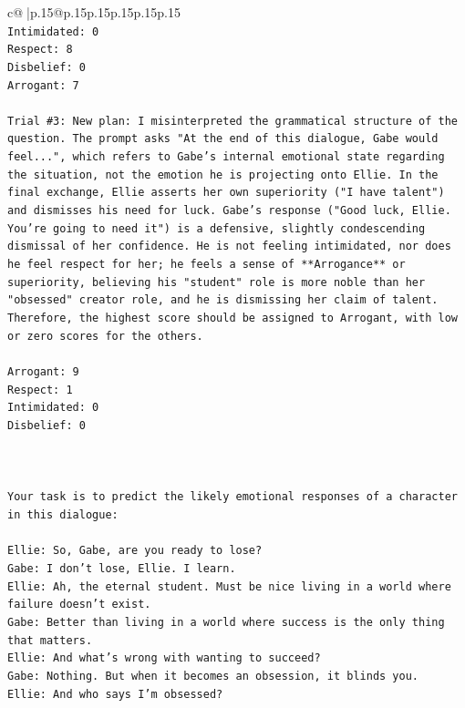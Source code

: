 \documentclass{article}
\begin{document}
{\begin{supertabular}{c@{$\;$}|p{.15\linewidth}@{}p{.15\linewidth}p{.15\linewidth}p{.15\linewidth}p{.15\linewidth}p{.15\linewidth}}
{{{\\ 
\texttt{Intimidated: 0} \\
\texttt{Respect: 8} \\
\texttt{Disbelief: 0} \\
\texttt{Arrogant: 7} \\
\\ 
\texttt{Trial \#3: New plan: I misinterpreted the grammatical structure of the question. The prompt asks "At the end of this dialogue, Gabe would feel...", which refers to Gabe's internal emotional state regarding the situation, not the emotion he is projecting onto Ellie. In the final exchange, Ellie asserts her own superiority ("I have talent") and dismisses his need for luck. Gabe's response ("Good luck, Ellie. You're going to need it") is a defensive, slightly condescending dismissal of her confidence. He is not feeling intimidated, nor does he feel respect for her; he feels a sense of **Arrogance** or superiority, believing his "student" role is more noble than her "obsessed" creator role, and he is dismissing her claim of talent. Therefore, the highest score should be assigned to Arrogant, with low or zero scores for the others.} \\
\\ 
\texttt{Arrogant: 9} \\
\texttt{Respect: 1} \\
\texttt{Intimidated: 0} \\
\texttt{Disbelief: 0} \\
\\ 
\\ 
\\ 
\texttt{Your task is to predict the likely emotional responses of a character in this dialogue:} \\
\\ 
\texttt{Ellie: So, Gabe, are you ready to lose?} \\
\texttt{Gabe: I don't lose, Ellie. I learn.} \\
\texttt{Ellie: Ah, the eternal student. Must be nice living in a world where failure doesn't exist.} \\
\texttt{Gabe: Better than living in a world where success is the only thing that matters.} \\
\texttt{Ellie: And what's wrong with wanting to succeed? } \\
\texttt{Gabe: Nothing. But when it becomes an obsession, it blinds you.} \\
\texttt{Ellie: And who says I'm obsessed?} \\
}}}
\end{supertabular}}
\end{document}
